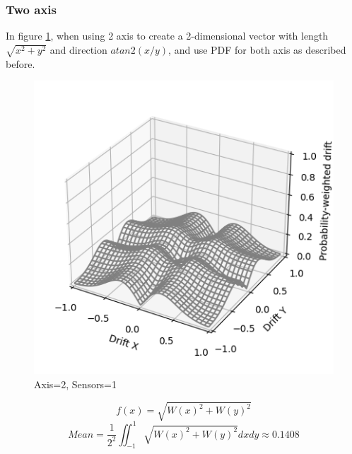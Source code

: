 \documentclass[10pt, twocolumn, a4paper]{article}
\begin{document}
        \subsubsection{Two axis}
            In figure \ref{fig_zero_21}, when using 2 axis to create a 2-dimensional vector with length $\sqrt{x^2 + y^2}$ and direction $ atan2(x / y) $, and use PDF for both axis as described before.
            \begin{figure}[H]
                \begin{center}
                    \caption{Axis=2, Sensors=1}
                    \label{fig_zero_21}
                    \includegraphics[width=0.8\linewidth]{multiple_ars/figure_drift_3.png}
                \end{center}
            \end{figure}
            \vspace{-8mm}
            $$ f(x) = \sqrt{W(x)^2 + W(y)^2} $$
            $$ Mean = \frac{1}{2^2} \iint_{-1}^1 \sqrt{W(x)^2 + W(y)^2} dx dy \approx 0.1408 $$
\end{document}
